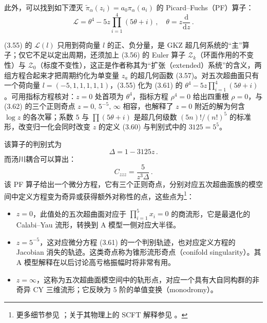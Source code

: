 此外，可以找到如下湮灭 $\tilde\pi_\alpha(z_i)=a_0\pi_\alpha(a_i)$ 的 Picard--Fuchs（PF）算子：
\begin{equation}\tag{3.61}
\mathcal{L}=\theta^4-5z\prod_{i=1}^{4}(5\theta+i)\,,\quad \theta=z\frac{\mathrm{d}}{\mathrm{d}z}\,.
\end{equation}

\begin{yizhu}[易错点]
(3.55) 的 $\mathcal{L}(l)$ 只用到荷向量 $l$ 的正、负分量，是 GKZ 超几何系统的“主”算子；仅它不足以定出周期，还须加上 (3.56) 的 Euler 算子 $\mathcal{Z}_k$（环面作用的不变性）与 $\mathcal{Z}_0$（标度不变性），这正是作者称其为“扩张（extended）系统”的含义，两组方程合起来才把周期约化为单变量 $z_a$ 的超几何函数 (3.57)。对五次超曲面只有一个荷向量 $l=(-5,1,1,1,1,1)$，(3.55) 化为 (3.61) 的 $\theta^4-5z\prod_{i=1}^{4}(5\theta+i)$。可用指标方程核对：$z=0$ 处首项为 $\theta^4$，指标方程 $\rho^4=0$ 给出四重根 $\rho=0$，与 (3.62) 的三个正则奇点 $z=0,\,5^{-5},\,\infty$ 相容，也解释了 $z=0$ 附近的解为何含 $\log z$ 的各次幂；系数 $5$ 与 $\prod(5\theta+i)$ 是超几何级数 $(5n)!/(n!)^5$ 的标准形，改变归一化会同时改变 $z$ 的定义 (3.60) 与判别式中的 $3125=5^5$。
\end{yizhu}

该算子的判别式为
\begin{equation}\tag{3.62}
\Delta=1-3125z\,.
\end{equation}
而汤川耦合可以算出：
\begin{equation}\tag{3.63}
C_{zzz}=\frac{5}{z^3\Delta}\,.
\end{equation}
该 PF 算子给出一个微分方程，它有三个正则奇点，分别对应五次超曲面族的模空间中定义方程变为奇异或获得额外对称性的点，这些点为\footnote{更多细节参见 \cite{ref48}；关于其物理上的 SCFT 解释参见 \cite{ref69}。}：
\begin{itemize}[leftmargin=1.4em,itemsep=1pt,topsep=2pt]
  \item $z=0$，此值处的五次超曲面对应于 $\prod_{i=1}^{5}x_i=0$ 的商流形，它是最退化的 Calabi--Yau 流形，转换到 A 模型一侧对应大半径。
  \item $z=5^{-5}$，这对应微分方程 (3.61) 的一个判别轨迹，也对应定义方程的 Jacobian 消失的轨迹。这类奇点称为锥形流形奇点（conifold singularity）。其 A 模型解释在以后讨论高亏格振幅时将非常有用。
  \item $z=\infty$，这称为五次超曲面模空间中的轨形点，对应一个具有大自同构群的非奇异 CY 三维流形；它反映为 5 阶的单值变换（monodromy）。
\end{itemize}

